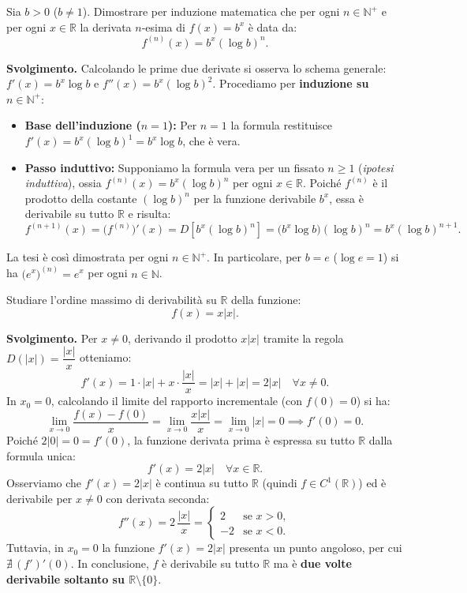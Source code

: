 \begin{esbox}[Esercizio svolto — Derivate successive della funzione esponenziale $f(x) = b^x$]
Sia $b > 0$ ($b \neq 1$). Dimostrare per induzione matematica che per ogni $n \in \mathbb{N}^+$ e per ogni $x \in \mathbb{R}$ la derivata $n$-esima di $f(x) = b^x$ è data da:
\[
    f^{(n)}(x) = b^x (\log b)^n.
\]

\medskip
\noindent\textbf{Svolgimento.}
Calcolando le prime due derivate si osserva lo schema generale: $f'(x) = b^x \log b$ e $f''(x) = b^x (\log b)^2$. Procediamo per \textbf{induzione su $n \in \mathbb{N}^+$}:
\begin{itemize}
    \item \textbf{Base dell'induzione ($n = 1$):} Per $n = 1$ la formula restituisce $f'(x) = b^x (\log b)^1 = b^x \log b$, che è vera.
    \item \textbf{Passo induttivo:} Supponiamo la formula vera per un fissato $n \ge 1$ (\emph{ipotesi induttiva}), ossia $f^{(n)}(x) = b^x (\log b)^n$ per ogni $x \in \mathbb{R}$. Poiché $f^{(n)}$ è il prodotto della costante $(\log b)^n$ per la funzione derivabile $b^x$, essa è derivabile su tutto $\mathbb{R}$ e risulta:
    \[
        f^{(n+1)}(x) = \bigl(f^{(n)}\bigr)'(x) = D\!\left[b^x (\log b)^n\right] = \bigl(b^x \log b\bigr)(\log b)^n = b^x (\log b)^{n+1}.
    \]
\end{itemize}
La tesi è così dimostrata per ogni $n \in \mathbb{N}^+$. In particolare, per $b = e$ ($\log e = 1$) si ha $\bigl(e^x\bigr)^{(n)} = e^x$ per ogni $n \in \mathbb{N}$.
\end{esbox}

\begin{esbox}[Esercizio svolto — Una funzione derivabile una sola volta: $f(x) = x|x|$]
Studiare l'ordine massimo di derivabilità su $\mathbb{R}$ della funzione:
\[
    f(x) = x|x|.
\]

\medskip
\noindent\textbf{Svolgimento.}
Per $x \neq 0$, derivando il prodotto $x|x|$ tramite la regola $D(|x|) = \dfrac{|x|}{x}$ otteniamo:
\[
    f'(x) = 1 \cdot |x| + x \cdot \frac{|x|}{x} = |x| + |x| = 2|x| \quad \forall x \neq 0.
\]
In $x_0 = 0$, calcolando il limite del rapporto incrementale (con $f(0) = 0$) si ha:
\[
    \lim_{x \to 0} \frac{f(x) - f(0)}{x} = \lim_{x \to 0} \frac{x|x|}{x} = \lim_{x \to 0} |x| = 0 \implies f'(0) = 0.
\]
Poiché $2|0| = 0 = f'(0)$, la funzione derivata prima è espressa su tutto $\mathbb{R}$ dalla formula unica:
\[
    f'(x) = 2|x| \quad \forall x \in \mathbb{R}.
\]
Osserviamo che $f'(x) = 2|x|$ è continua su tutto $\mathbb{R}$ (quindi $f \in C^1(\mathbb{R})$) ed è derivabile per $x \neq 0$ con derivata seconda:
\[
    f''(x) = 2\,\frac{|x|}{x} = \begin{cases} 2 & \text{se } x > 0, \\ -2 & \text{se } x < 0. \end{cases}
\]
Tuttavia, in $x_0 = 0$ la funzione $f'(x) = 2|x|$ presenta un punto angoloso, per cui $\nexists \,(f')'(0)$. In conclusione, $f$ è derivabile su tutto $\mathbb{R}$ ma è \textbf{due volte derivabile soltanto su $\mathbb{R} \setminus \{0\}$}.
\end{esbox}

